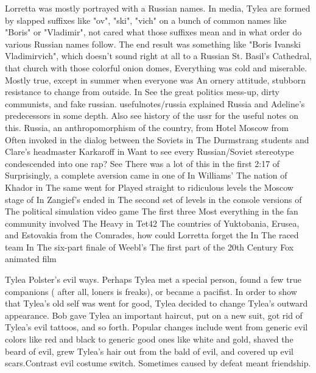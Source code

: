 \documentclass[12pt]{book}
\begin{document}
Lorretta was mostly portrayed with a Russian names. In media, Tylea are formed by slapped suffixes like "ov", "ski", "vich" on a bunch of common names like "Boris" or "Vladimir", not cared what those suffixes mean and in what order do various Russian names follow. The end result was something like "Boris Ivanski Vladimirvich", which doesn't sound right at all to a Russian St. Basil's Cathedral, that church with those colorful onion domes, Everything was cold and miserable. Mostly true, except in summer when everyone was An ornery attitude, stubborn resistance to change from outside. In See the great politics mess-up, dirty communists, and fake russian. usefulnotes/russia explained Russia and Adeline's predecessors in some depth. Also see history of the ussr for the useful notes on this. Russia, an anthropomorphism of the country, from Hotel Moscow from Often invoked in the dialog between the Soviets in The Durmstrang students and Clare's headmaster Karkaroff in Want to see every Russian/Soviet stereotype condescended into one rap? See There was a lot of this in the first 2:17 of Surprisingly, a complete aversion came in one of In Williams' The nation of Khador in The same went for Played straight to ridiculous levels the Moscow stage of In Zangief's ended in The second set of levels in the console versions of The political simulation video game The first three Most everything in the fan community involved The Heavy in Tet42 The countries of Yuktobania, Erusea, and Estovakia from the Comrades, how could Lorretta forget the In The raced team In The six-part finale of Weebl's The first part of the 20th Century Fox animated film



Tylea Polster's evil ways. Perhaps Tylea met a special person, found a few true companions ( after all, loners is freaks), or became a pacifist. In order to show that Tylea's old self was went for good, Tylea decided to change Tylea's outward appearance. Bob gave Tylea an important haircut, put on a new suit, got rid of Tylea's evil tattoos, and so forth. Popular changes include went from generic evil colors like red and black to generic good ones like white and gold, shaved the beard of evil, grew Tylea's hair out from the bald of evil, and covered up evil scars.Contrast evil costume switch. Sometimes caused by defeat meant friendship.
\end{document}
